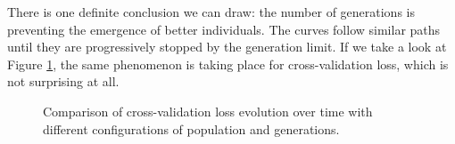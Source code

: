 	There is one definite conclusion we can draw: the number of generations is preventing the emergence of better individuals. The curves follow similar paths until they are progressively stopped by the generation limit. If we take a look at Figure \ref{gfx:fs_popgen_cv}, the same phenomenon is taking place for cross-validation loss, which is not surprising at all.

\newpage

	\begin{figure}[bth]

        \begin{center}

        	\setlength{\fboxrule}{0pt}

		\end{center}
		\caption[Cross-validation loss comparison for different populations and generations]{Comparison of cross-validation loss evolution over time with different configurations of population and generations.}\label{gfx:fs_popgen_cv}

	\end{figure}


